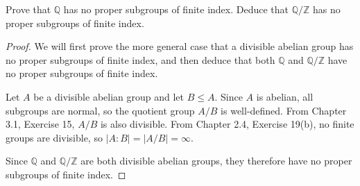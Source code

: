\documentclass{article}
\begin{document}
Prove that $\mathbb{Q}$ has no proper subgroups of finite index. Deduce that $\mathbb{Q}/\mathbb{Z}$ has no proper subgroups of finite index.

\begin{proof}
    We will first prove the more general case that a divisible abelian group has no proper subgroups of finite index, and then deduce that both $\mathbb{Q}$ and $\mathbb{Q}/\mathbb{Z}$ have no proper subgroups of finite index.

    Let $A$ be a divisible abelian group and let $B \leq A$. Since $A$ is abelian, all subgroups are normal, so the quotient group $A/B$ is well-defined. From Chapter 3.1, Exercise 15,  $A/B$ is also divisible. From Chapter 2.4, Exercise 19(b), no finite groups are divisible, so $|A:B| = |A/B| = \infty$.

    Since $\mathbb{Q}$ and $\mathbb{Q}/\mathbb{Z}$ are both divisible abelian groups, they therefore have no proper subgroups of finite index.
\end{proof}
\end{document}
